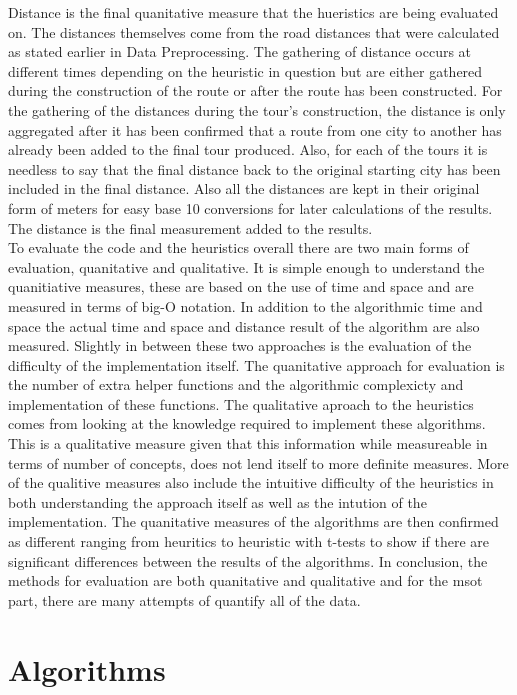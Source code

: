 \documentclass[midd]{thesis}
\newcommand{\tab}{\hspace*{2em}}
\begin{document}
\tab Distance is the final quanitative measure that the hueristics are being evaluated on. The distances themselves come from the road distances that were calculated as stated earlier in Data Preprocessing. The gathering of distance occurs at different times depending on the heuristic in question but are either gathered during the construction of the route or after the route has been constructed. For the gathering of the distances during the tour's construction, the distance is only aggregated after it has been confirmed that a route from one city to another has already been added to the final tour produced. Also, for each of the tours it is needless to say that the final distance back to the original starting city has been included in the final distance. Also all the distances are kept in their original form of meters for easy base 10 conversions for later calculations of the results. The distance is the final measurement added to the results.\\
\tab To evaluate the code and the heuristics overall there are two main forms of evaluation, quanitative and qualitative. It is simple enough to understand the quanitiative measures, these are based on the use of time and space and are measured in terms of big-O notation. In addition to the algorithmic time and space the actual time and space and distance result of the algorithm are also measured. Slightly in between these two approaches is the evaluation of the difficulty of the implementation itself. The quanitative approach for evaluation is the number of extra helper functions and the algorithmic complexicty and implementation of these functions. The qualitative aproach to the heuristics comes from looking at the knowledge required to implement these algorithms. This is a qualitative measure given that this information while measureable in terms of number of concepts, does not lend itself to more definite measures. More of the qualitive measures also include the intuitive difficulty of the heuristics in both understanding the approach itself as well as the intution of the implementation. The quanitative measures of the algorithms are then confirmed as different ranging from heuritics to heuristic with t-tests to show if there are significant differences between the results of the algorithms. In conclusion, the methods for evaluation are both quanitative and qualitative and for the msot part, there are many attempts of quantify all of the data.

\chapter{Algorithms}
\end{document}
